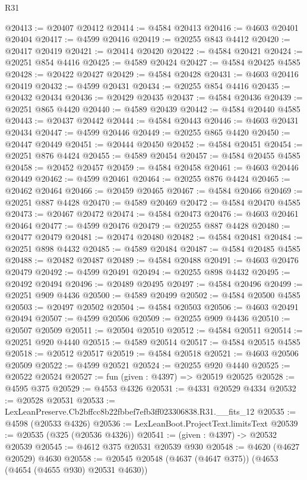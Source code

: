 \begin{lexlean}{R31}
\begin{coremodule}
@20413 := @20407 @20412
@20414 := @4584 @20413
@20416 := @4603 @20401 @20404
@20417 := @4599 @20416
@20419 := @20255 @843 @4412
@20420 := @20417 @20419
@20421 := @20414 @20420
@20422 := @4584 @20421
@20424 := @20251 @854 @4416
@20425 := @4589 @20424
@20427 := @4584 @20425 @4585
@20428 := @20422 @20427
@20429 := @4584 @20428
@20431 := @4603 @20416 @20419
@20432 := @4599 @20431
@20434 := @20255 @854 @4416
@20435 := @20432 @20434
@20436 := @20429 @20435
@20437 := @4584 @20436
@20439 := @20251 @865 @4420
@20440 := @4589 @20439
@20442 := @4584 @20440 @4585
@20443 := @20437 @20442
@20444 := @4584 @20443
@20446 := @4603 @20431 @20434
@20447 := @4599 @20446
@20449 := @20255 @865 @4420
@20450 := @20447 @20449
@20451 := @20444 @20450
@20452 := @4584 @20451
@20454 := @20251 @876 @4424
@20455 := @4589 @20454
@20457 := @4584 @20455 @4585
@20458 := @20452 @20457
@20459 := @4584 @20458
@20461 := @4603 @20446 @20449
@20462 := @4599 @20461
@20464 := @20255 @876 @4424
@20465 := @20462 @20464
@20466 := @20459 @20465
@20467 := @4584 @20466
@20469 := @20251 @887 @4428
@20470 := @4589 @20469
@20472 := @4584 @20470 @4585
@20473 := @20467 @20472
@20474 := @4584 @20473
@20476 := @4603 @20461 @20464
@20477 := @4599 @20476
@20479 := @20255 @887 @4428
@20480 := @20477 @20479
@20481 := @20474 @20480
@20482 := @4584 @20481
@20484 := @20251 @898 @4432
@20485 := @4589 @20484
@20487 := @4584 @20485 @4585
@20488 := @20482 @20487
@20489 := @4584 @20488
@20491 := @4603 @20476 @20479
@20492 := @4599 @20491
@20494 := @20255 @898 @4432
@20495 := @20492 @20494
@20496 := @20489 @20495
@20497 := @4584 @20496
@20499 := @20251 @909 @4436
@20500 := @4589 @20499
@20502 := @4584 @20500 @4585
@20503 := @20497 @20502
@20504 := @4584 @20503
@20506 := @4603 @20491 @20494
@20507 := @4599 @20506
@20509 := @20255 @909 @4436
@20510 := @20507 @20509
@20511 := @20504 @20510
@20512 := @4584 @20511
@20514 := @20251 @920 @4440
@20515 := @4589 @20514
@20517 := @4584 @20515 @4585
@20518 := @20512 @20517
@20519 := @4584 @20518
@20521 := @4603 @20506 @20509
@20522 := @4599 @20521
@20524 := @20255 @920 @4440
@20525 := @20522 @20524
@20527 := fun (given : @4397) => @20519 @20525
@20528 := @4595 @375
@20529 := @4553 @4326
@20531 := @4331 @20529 @4334
@20532 := @20528 @20531
@20533 := LexLeanPreserve.Cb2bffcc8b22fbbef7efb3ff023306838.R31.__fits_12
@20535 := @4598 (@20533 @4326)
@20536 := LexLeanBoot.ProjectText.limitsText
@20539 := @20535 (@325 (@20536 @4326))
@20541 := (given : @4397) -> @20532 @20539
@20545 := @4612 @375 @20531 @20539 @930
@20548 := @4620 (@4627 @20529) @4630
@20558 := @20545 @20548 (@4637 (@4647 @375)) (@4653 (@4654 (@4655 @930) @20531 @4630))

\end{coremodule}
\end{lexlean}
